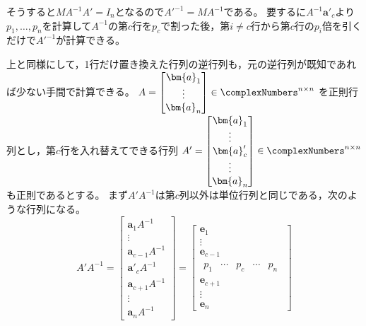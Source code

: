         そうすると$MA^{-1}A'=I_n$となるので$A'^{-1} = MA^{-1}$である。
        要するに$A^{-1}\bm{a}'_c$より$p_1,\dotsc,p_n$を計算して$A^{-1}$の第$c$行を$p_c$で割った後，第$i\neq c$行から第$c$行の$p_i$倍を引くだけで$A'^{-1}$が計算できる。
        \newline\par
        上と同様にして，1行だけ置き換えた行列の逆行列も，元の逆行列が既知であれば少ない手間で計算できる。
        $
            A =
            \begin{bmatrix}
                \bm{a}_1 \\
                \vdots \\
                \bm{a}_n
            \end{bmatrix}
            \in\complexNumbers^{n\times n}
        $
        を正則行列とし，第$c$行を入れ替えてできる行列
        $
            A' =
            \begin{bmatrix}
                \bm{a}_1 \\
                \vdots \\
                \bm{a}'_c \\
                \vdots \\
                \bm{a}_n
            \end{bmatrix}
            \in\complexNumbers^{n\times n}
        $
        も正則であるとする。
        まず$A'A^{-1}$は第$c$列以外は単位行列と同じである，次のような行列になる。
        \[
            A'A^{-1} =
            \begin{bmatrix}
                \bm{a}_1 A^{-1} \\
                \vdots \\
                \bm{a}_{c-1} A^{-1} \\
                \bm{a}'_c A^{-1} \\
                \bm{a}_{c+1} A^{-1} \\
                \vdots \\
                \bm{a}_n A^{-1}
            \end{bmatrix}
            =
            \begin{bmatrix}
                \bm{e}_1 \\
                \vdots \\
                \bm{e}_{c-1} \\
                \begin{matrix}
                    p_1 & \cdots & p_c & \cdots & p_n
                \end{matrix} \\
                \bm{e}_{c+1} \\
                \vdots \\
                \bm{e}_n
            \end{bmatrix}
        \]
